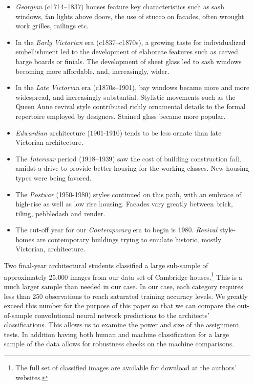 \documentclass[]{article}
\let\rmarkdownfootnote\footnote%
\def\footnote{\protect\rmarkdownfootnote}
\begin{document}
\begin{itemize}
\item
  \emph{Georgian} (c1714--1837) houses feature key characteristics such
  as sash windows, fan lights above doors, the use of stucco on facades,
  often wrought work grilles, railings etc.\label{def_eras}
\item
  In the \emph{Early Victorian} era (c1837--c1870s), a growing taste for
  individualized embellishment led to the development of elaborate
  features such as carved barge boards or finials. The development of
  sheet glass led to sash windows becoming more affordable, and,
  increasingly, wider.
\item
  In the \emph{Late Victorian} era (c1870s--1901), bay windows became
  more and more widespread, and increasingly substantial. Stylistic
  movements such as the Queen Anne revival style contributed richly
  ornamental details to the formal repertoire employed by designers.
  Stained glass became more popular.
\item
  \emph{Edwardian} architecture (1901-1910) tends to be less ornate than
  late Victorian architecture.
\item
  The \emph{Interwar} period (1918--1939) saw the cost of building
  construction fall, amidst a drive to provide better housing for the
  working classes. New housing types were being favored.
\item
  The \emph{Postwar} (1950-1980) styles continued on this path, with an
  embrace of high-rise as well as low rise housing. Facades vary greatly
  between brick, tiling, pebbledash and render.
\item
  The cut-off year for our \emph{Contemporary} era to begin is 1980.
  \emph{Revival} style-homes are contemporary buildings trying to
  emulate historic, mostly Victorian, architecture.
\end{itemize}

Two final-year architectural students classified a large sub-sample of
approximately 25,000 images from our data set of Cambridge
houses.\footnote{The full set of classified images are available for download at the authors' websites.}
This is a much larger sample than needed in our case. In our case, each
category requires less than 250 observations to reach saturated training
accuracy levels. We greatly exceed this number for the purpose of this
paper so that we can compare the out-of-sample convolutional neural
network predictions to the architects' classifications. This allows us
to examine the power and size of the assignment tests. In addition
having both human and machine classification for a large sample of the
data allows for robustness checks on the machine comparisons.
\end{document}
